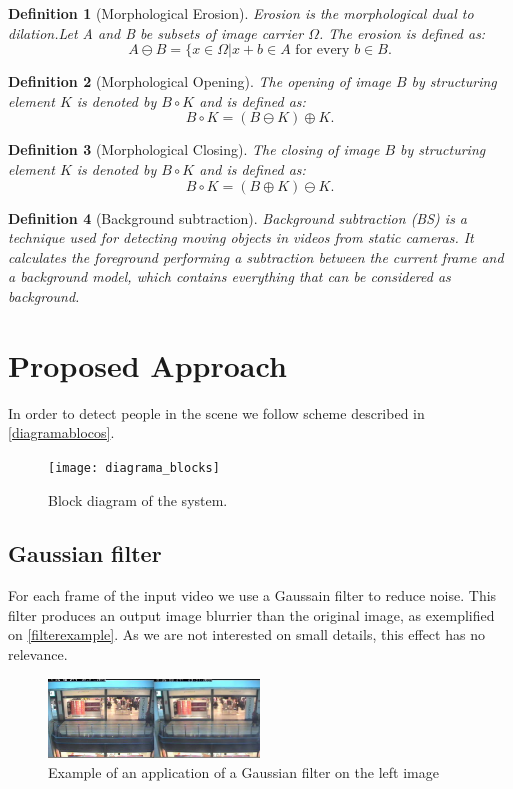 \documentclass[10pt, conference]{IEEEtran}
\newtheorem{definition}{Definition}
\begin{document}
	\begin{definition}[Morphological Erosion]
		Erosion is the morphological dual to dilation.Let A and B be subsets of image carrier $\Omega$. The erosion is defined as: $$A \ominus B=\{x\in\Omega | x+b \in A \text{ for every }b\in B.$$
	\end{definition}
	
	\begin{definition}[Morphological Opening]
		The opening of image $B$ by structuring	element $K$ is denoted by $B \circ K$ and is defined as: $$B \circ K =(B \ominus K) \oplus K.$$
	\end{definition}
	
	\begin{definition}[Morphological Closing]
		The closing of image $B$ by structuring	element $K$ is denoted by $B \circ K$ and is defined as: $$B \circ K =(B \oplus K) \ominus K.$$
	\end{definition}
	
	\begin{definition}[Background subtraction]
		Background subtraction (BS) is a technique used for detecting moving objects in videos from static cameras. It calculates the foreground performing a subtraction between the current frame and a background model, which contains everything that can be considered as background.
	\end{definition}
	
	\section{Proposed Approach}
	In order to detect people in the scene we follow scheme described in \autoref{diagramablocos}.
	\begin{figure}[H]
		\centering
		\texttt{[image: diagrama\_blocks]}
		\caption{Block diagram of the system.}
		\label{diagramablocos}
	\end{figure}
	
	
	\subsection{Gaussian filter}
	For each frame of the input video we use a Gaussain filter to reduce noise. This filter produces an output image blurrier than the original image, as exemplified on \autoref{filterexample}. As we are not interested on small details, this effect has no relevance.
	\begin{figure}[H]
		\includegraphics[width=0.5\textwidth]{filterexample}
		\centering
		\caption{Example of an application of a Gaussian filter on the left image}
		\label{filterexample}
	\end{figure}
\end{document}
